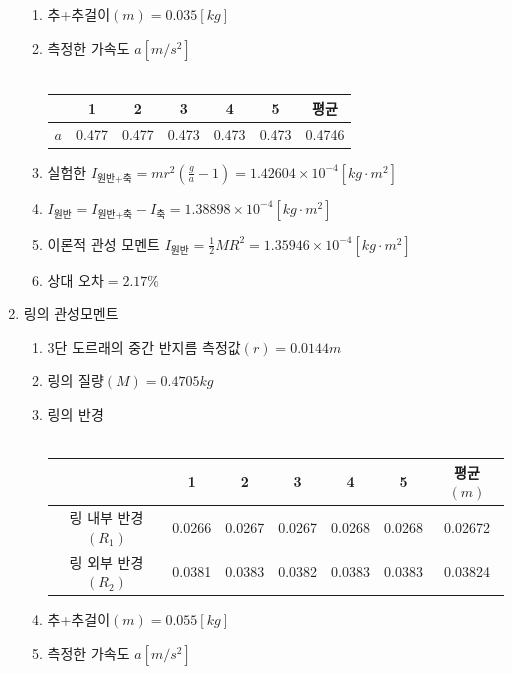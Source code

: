 \documentclass[12pt,a4paper]{article}
\begin{document}
\begin{enumerate}
\begin{enumerate}
            \item 추+추걸이$(m)=0.035[kg]$
            \item 측정한 가속도 $a[m/s^2]$ \\
                \\
                \begin{tabular}{|c|c|c|c|c|c|c|}
                    \hline
                    &1&2&3&4&5&평균 \\
                    \hline
                    $a$&0.477&0.477&0.473&0.473&0.473&0.4746 \\
                    \hline
                \end{tabular}
            \item 실험한 $I_{\textrm{원반+축}}=
                mr^2(\frac{g}{a}-1)=1.42604\times10^{-4}[kg\cdot m^2]$
            \item $I_{\textrm{원반}}=I_{\textrm{원반+축}}-I_{\textrm{축}}=
                1.38898\times10^{-4}[kg\cdot m^2]$
            \item 이론적 관성 모멘트 $I_{\textrm{원반}}=\frac{1}{2}MR^2=
                1.35946\times10^{-4}[kg\cdot m^2]$
            \item 상대 오차$=2.17\%$
        \end{enumerate}
        \clearpage
    \item 링의 관성모멘트
        \begin{enumerate}
            \item 3단 도르래의 중간 반지름 측정값$(r)=0.0144m$
            \item 링의 질량$(M)=0.4705kg$
            \item 링의 반경 \\
                \\
                \begin{tabular}{|c|c|c|c|c|c|c|}
                    \hline
                    &1&2&3&4&5&평균$(m)$ \\
                    \hline
                    링 내부 반경$(R_1)$&0.0266&0.0267&0.0267&0.0268&0.0268&
                        0.02672 \\
                    \hline
                    링 외부 반경$(R_2)$&0.0381&0.0383&0.0382&0.0383&0.0383&
                        0.03824 \\
                    \hline
                \end{tabular}
            \item 추+추걸이$(m)=0.055[kg]$
            \item 측정한 가속도 $a[m/s^2]$ \\

\end{enumerate}
\end{enumerate}
\end{document}
